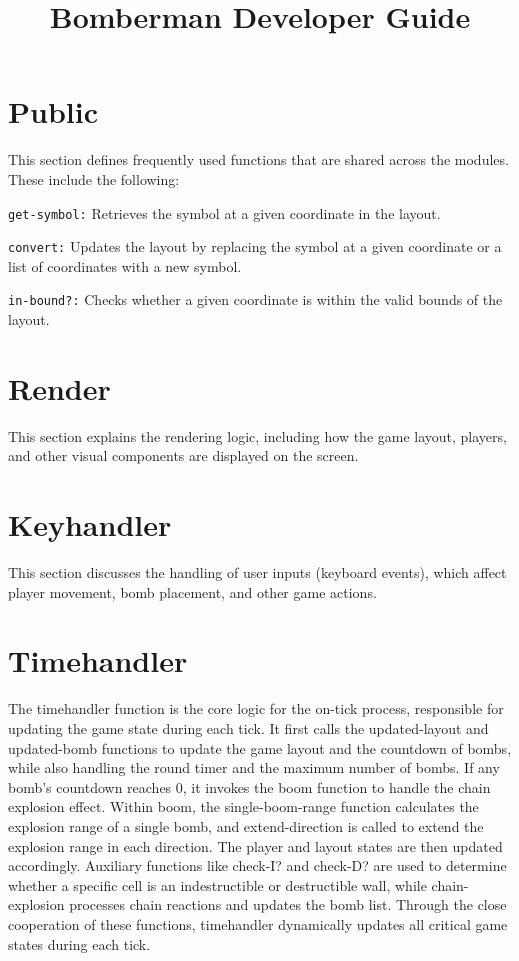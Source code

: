 \documentclass[12pt]{article}
\title{\fontsize{30}{24}\selectfont \textbf{Bomberman Developer Guide}} %
\author{}
\date{}
\begin{document}
\maketitle

\section{Public}
\hspace{1.27cm}This section defines frequently used functions that are shared across the modules. These include the following:

\texttt{get-symbol:} Retrieves the symbol at a given coordinate in the layout. 

\texttt{convert:} Updates the layout by replacing the symbol at a given coordinate or a list of coordinates with a new symbol. 

\texttt{in-bound?:} Checks whether a given coordinate is within the valid bounds of the layout. 

\section{Render}
\hspace{1.27cm}This section explains the rendering logic, including how the game layout, players, and other visual components are displayed on the screen.

\section{Keyhandler}
\hspace{1.27cm}This section discusses the handling of user inputs (keyboard events), which affect player movement, bomb placement, and other game actions.

\section{Timehandler}
\hspace{1.27cm}The timehandler function is the core logic for the on-tick process, responsible for updating the game state during each tick. It first calls the updated-layout and updated-bomb functions to update the game layout and the countdown of bombs, while also handling the round timer and the maximum number of bombs. If any bomb's countdown reaches 0, it invokes the boom function to handle the chain explosion effect. Within boom, the single-boom-range function calculates the explosion range of a single bomb, and extend-direction is called to extend the explosion range in each direction. The player and layout states are then updated accordingly. Auxiliary functions like check-I? and check-D? are used to determine whether a specific cell is an indestructible or destructible wall, while chain-explosion processes chain reactions and updates the bomb list. Through the close cooperation of these functions, timehandler dynamically updates all critical game states during each tick.
\end{document}
